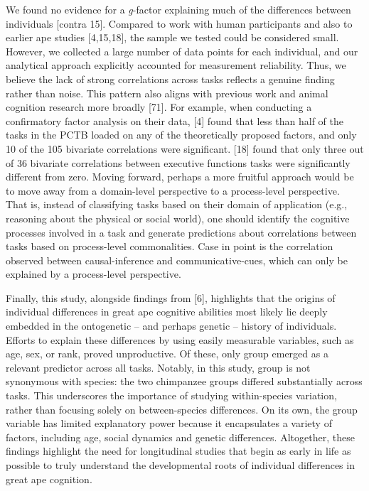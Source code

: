 \documentclass[
  man,floatsintext]{apa6}
\begin{document}
We found no evidence for a \emph{g}-factor explaining much of the differences between individuals {[}contra 15{]}. Compared to work with human participants and also to earlier ape studies {[}4,15,18{]}, the sample we tested could be considered small. However, we collected a large number of data points for each individual, and our analytical approach explicitly accounted for measurement reliability. Thus, we believe the lack of strong correlations across tasks reflects a genuine finding rather than noise. This pattern also aligns with previous work and animal cognition research more broadly {[}71{]}. For example, when conducting a confirmatory factor analysis on their data, {[}4{]} found that less than half of the tasks in the PCTB loaded on any of the theoretically proposed factors, and only 10 of the 105 bivariate correlations were significant. {[}18{]} found that only three out of 36 bivariate correlations between executive functions tasks were significantly different from zero. Moving forward, perhaps a more fruitful approach would be to move away from a domain-level perspective to a process-level perspective. That is, instead of classifying tasks based on their domain of application (e.g., reasoning about the physical or social world), one should identify the cognitive processes involved in a task and generate predictions about correlations between tasks based on process-level commonalities. Case in point is the correlation observed between causal-inference and communicative-cues, which can only be explained by a process-level perspective.

Finally, this study, alongside findings from {[}6{]}, highlights that the origins of individual differences in great ape cognitive abilities most likely lie deeply embedded in the ontogenetic -- and perhaps genetic -- history of individuals. Efforts to explain these differences by using easily measurable variables, such as age, sex, or rank, proved unproductive. Of these, only group emerged as a relevant predictor across all tasks. Notably, in this study, group is not synonymous with species: the two chimpanzee groups differed substantially across tasks. This underscores the importance of studying within-species variation, rather than focusing solely on between-species differences. On its own, the group variable has limited explanatory power because it encapsulates a variety of factors, including age, social dynamics and genetic differences. Altogether, these findings highlight the need for longitudinal studies that begin as early in life as possible to truly understand the developmental roots of individual differences in great ape cognition.
\end{document}
